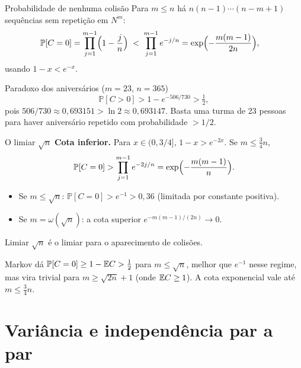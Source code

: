 \documentclass[aspectratio=169,11pt]{beamer}
\newcommand{\PP}{\mathbb P}
\begin{document}
\begin{frame}{Probabilidade de nenhuma colisão}
  Para $m\le n$ há $n(n-1)\cdots(n-m+1)$ sequências sem repetição em $N^m$:
  \begin{align*}
    \PP[C=0]&=\prod_{j=1}^{m-1}\Bigl(1-\frac jn\Bigr)
    \;<\;\prod_{j=1}^{m-1}e^{-j/n}
    =\exp\Bigl(-\frac{m(m-1)}{2n}\Bigr),
  \end{align*}
  usando $1-x<e^{-x}$.
  \pause
  \vspace{0.5em}
  \begin{exampleblock}{Paradoxo dos aniversários ($m=23$, $n=365$)}
    \[
      \PP[C>0]>1-e^{-506/730}>\tfrac12,
    \]
    pois $506/730\approx0{,}693151>\ln2\approx0{,}693147$. Basta uma turma de
    23 pessoas para haver aniversário repetido com probabilidade $>1/2$.
  \end{exampleblock}
\end{frame}

\begin{frame}{O limiar $\sqrt n$}
  \textbf{Cota inferior.} Para $x\in(0,3/4]$, $1-x>e^{-2x}$. Se $m\le\tfrac34n$,
  \[
    \PP[C=0]>\prod_{j=1}^{m-1}e^{-2j/n}=\exp\Bigl(-\frac{m(m-1)}n\Bigr).
  \]
  \pause
  \begin{itemize}
  \item Se $m\le\sqrt n$: $\PP[C=0]>e^{-1}>0{,}36$ (limitada por constante positiva).
  \item Se $m=\omega(\sqrt n)$: a cota superior $e^{-m(m-1)/(2n)}\to0$.
  \end{itemize}
  \pause
  \begin{alertblock}{Limiar}
    $\sqrt n$ é o limiar para o aparecimento de colisões.
  \end{alertblock}
  \begin{small}
  Markov dá $\PP[C=0]\ge1-\E C>\tfrac12$ para $m\le\sqrt n$, melhor que $e^{-1}$
  nesse regime, mas vira trivial para $m\ge\sqrt{2n}+1$ (onde $\mathbb{E} C\ge1$). A
  cota exponencial vale até $m\le\tfrac34n$.
  \end{small}
\end{frame}

\section{Variância e independência par a par}
\end{document}
